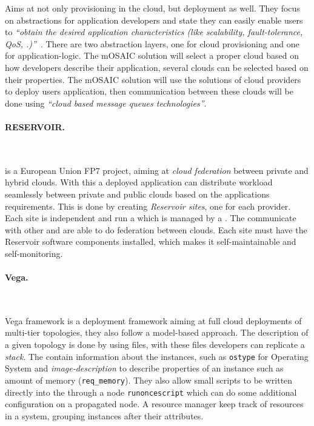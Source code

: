 Aims at not only provisioning in the cloud, but deployment as well.
They focus on abstractions for application developers and state they can easily enable users to
\emph{``obtain the desired application characteristics (like
scalability, fault-tolerance, QoS, \etc.)''}~\cite{architecturing:petcu11}.
There are two abstraction layers, one for cloud provisioning 
and one for application-logic.
The mOSAIC solution will select a proper cloud based on how developers describe their application,
several clouds can be selected based on their properties.
The mOSAIC solution will use the  solutions of cloud providers to deploy users application,
then communication between these clouds will be done using 
\emph{``cloud based message queues technologies''}.

\paragraph{RESERVOIR.}~\cite{reservoir:rochweger09}

 is a European Union FP7 project, 
aiming at \emph{cloud federation} between private and 
hybrid clouds. With this a deployed application can distribute workload 
seamlessly between private and public clouds based on the applications requirements.
This is done by creating \emph{Reservoir sites}, one for each provider.
Each site is independent and run a  which is managed by a . 
The  communicate with other  and are able to do
federation between clouds. Each site must have the Reservoir software components 
installed, which makes it self-maintainable and self-monitoring.

\paragraph{Vega.}~\cite{simplifying:chieu10} 

Vega framework is a deployment framework aiming 
at full cloud deployments of multi-tier topologies, 
they also follow a model-based approach. 
The description of a given topology is done by using  files, with these files
developers can replicate a \emph{stack}.
The  contain information about the instances, such as \texttt{ostype} for Operating System
and \emph{image-description} to describe properties of an instance such as amount of 
memory (\texttt{req\_memory}).
They also allow small scripts to be written directly into the  through a node
\texttt{runoncescript} which can do some additional configuration on a propagated node.
A resource manager keep track of resources in a system, grouping instances after their attributes.

